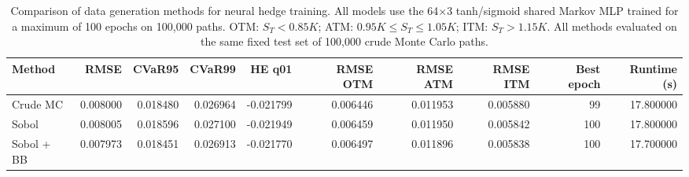 \begin{table}
\caption{Comparison of data generation methods for neural hedge training. All models use the 64$\times$3 tanh/sigmoid shared Markov MLP trained for a maximum of 100 epochs on 100,000 paths. OTM: $S_T < 0.85K$; ATM: $0.95K \leq S_T \leq 1.05K$; ITM: $S_T > 1.15K$. All methods evaluated on the same fixed test set of 100,000 crude Monte Carlo paths.}
\label{tab:data_generation}
\begin{tabular}{lrrrrrrrrr}
\toprule
Method & RMSE & CVaR95 & CVaR99 & HE q01 & RMSE OTM & RMSE ATM & RMSE ITM & Best epoch & Runtime (s) \\
\midrule
Crude MC & 0.008000 & 0.018480 & 0.026964 & -0.021799 & 0.006446 & 0.011953 & 0.005880 & 99 & 17.800000 \\
Sobol & 0.008005 & 0.018596 & 0.027100 & -0.021949 & 0.006459 & 0.011950 & 0.005842 & 100 & 17.800000 \\
Sobol + BB & 0.007973 & 0.018451 & 0.026913 & -0.021770 & 0.006497 & 0.011896 & 0.005838 & 100 & 17.700000 \\
\bottomrule
\end{tabular}
\end{table}
